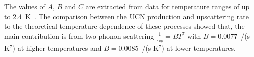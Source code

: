 The values of $A$, $B$ and $C$ are extracted from data for temperature
ranges of up to 2.4~K~\cite{Leung2016}. The comparison between the UCN
production and upscattering rate to the theoretical temperature
dependence of these processes showed that, the main contribution is
from two-phonon scattering $\frac{1}{\tau_{up}}=BT^7$ with
$B = 0.0077$~/(s K$^7$) at higher temperatures and $B = 0.0085$~/(s
K$^7$) at lower temperatures.











